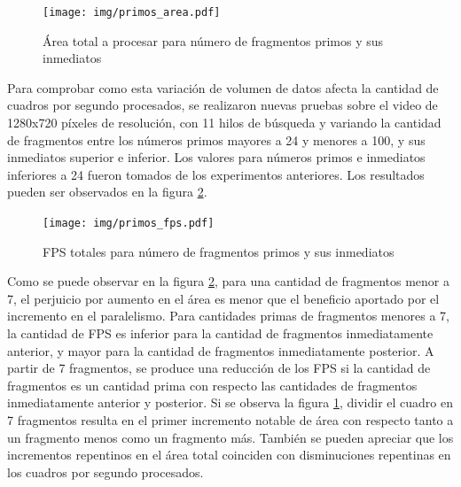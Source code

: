 \begin{figure}[!htb]

	\texttt{[image: img/primos\_area.pdf]}
	\caption{Área total a procesar para número de fragmentos primos y sus inmediatos}
	\label{primosArea}

\end{figure}

Para comprobar como esta variación de volumen de datos afecta la cantidad de
cuadros por segundo procesados, se realizaron nuevas pruebas sobre el video de
1280x720 píxeles de resolución, con 11 hilos de búsqueda y variando la cantidad
de fragmentos entre los números primos mayores a 24 y menores a 100, y sus
inmediatos superior e inferior. Los valores para números primos e inmediatos
inferiores a 24 fueron tomados de los experimentos anteriores. Los resultados
pueden ser observados en la figura \ref{primosFPS}.

\begin{figure}[!htb]

	\texttt{[image: img/primos\_fps.pdf]}
	\caption{FPS totales para número de fragmentos primos y sus inmediatos}
	\label{primosFPS}

\end{figure}

Como se puede observar en la figura \ref{primosFPS}, para una cantidad de
fragmentos menor a 7, el perjuicio por aumento en el área es menor que el
beneficio aportado por el incremento en el paralelismo. Para cantidades primas
de fragmentos menores a 7, la cantidad de FPS es inferior para la cantidad de
fragmentos inmediatamente anterior, y mayor para la cantidad de fragmentos
inmediatamente posterior. A partir de 7 fragmentos, se produce una reducción de
los FPS si la cantidad de fragmentos es un cantidad prima con respecto las
cantidades de fragmentos inmediatamente anterior y posterior. Si se observa la
figura \ref{primosArea}, dividir el cuadro en 7 fragmentos resulta en el primer
incremento notable de área con respecto tanto a un fragmento menos como un
fragmento más. También se pueden apreciar que los incrementos repentinos en el
área total coinciden con disminuciones repentinas en los cuadros por segundo
procesados.

